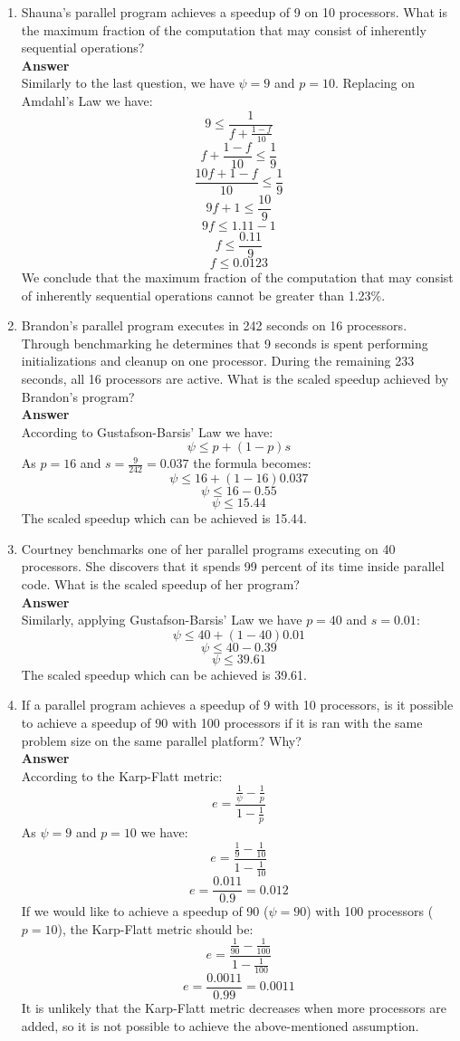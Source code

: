 \documentclass[10pt]{scrartcl}
\begin{document}
\begin{enumerate}
 \item Shauna's parallel program achieves a speedup of 9 on 10 processors. What is the maximum fraction of the computation that may consist of inherently sequential operations?
 \\ 
 \textbf{Answer}
 \\
 Similarly to the last question, we have $\psi=9$ and $p=10$.  Replacing on Amdahl's Law we have:
 $$ 9 \leq \frac{1}{f + \frac{1 - f}{10}} $$
 $$ f + \frac{1 - f}{10} \leq \frac{1}{9} $$
 $$ \frac{10f + 1 - f}{10} \leq \frac{1}{9} $$
 $$ 9f + 1 \leq \frac{10}{9} $$
 $$ 9f \leq 1.11 - 1 $$
 $$ f \leq \frac{0.11}{9} $$
 $$ f \leq 0.0123 $$
 We conclude that the maximum fraction of the computation that may consist of inherently sequential operations cannot be greater than 1.23\%.
 
 \item Brandon's parallel program executes in 242 seconds on 16 processors. Through benchmarking he determines that 9 seconds is spent performing initializations and cleanup on one processor. During the remaining 233 seconds, all 16 processors are active. What is the scaled speedup achieved by Brandon's program?
 \\ 
 \textbf{Answer}
 \\
 According to Gustafson-Barsis' Law we have:
 $$\psi \leq p + (1 - p)s$$
 As $p=16$ and $s=\frac{9}{242} = 0.037$ the formula becomes:
 $$\psi \leq 16 + (1 - 16)0.037$$
 $$\psi \leq 16 - 0.55$$
 $$\psi \leq 15.44$$
 The scaled speedup which can be achieved is 15.44. 
 
 \item Courtney benchmarks one of her parallel programs executing on 40 processors. She discovers that it spends 99 percent of its time inside parallel code. What is the scaled speedup of her program?
 \\ 
 \textbf{Answer}
 \\
 Similarly, applying Gustafson-Barsis' Law we have $p=40$ and $s=0.01$:
 $$\psi \leq 40 + (1 - 40)0.01$$
 $$\psi \leq 40 - 0.39$$
 $$\psi \leq 39.61$$
 The scaled speedup which can be achieved is 39.61. 
 
 
 \item If a parallel program achieves a speedup of 9 with 10 processors, is it possible to achieve a speedup of 90 with 100 processors if it is ran with the same problem size on the same parallel platform? Why?
 \\ 
 \textbf{Answer}
 \\
 According to the Karp-Flatt metric:
 $$e=\frac{\frac{1}{\psi}-\frac{1}{p}}{1-\frac{1}{p}}$$
 As $\psi=9$ and $p=10$ we have:
 $$e=\frac{\frac{1}{9}-\frac{1}{10}}{1-\frac{1}{10}}$$
 $$e=\frac{0.011}{0.9} = 0.012$$
 If we would like to achieve a speedup of 90 ($\psi=90$) with 100 processors ($p=10$), the Karp-Flatt metric should be:
 $$e=\frac{\frac{1}{90}-\frac{1}{100}}{1-\frac{1}{100}}$$
 $$e=\frac{0.0011}{0.99} = 0.0011$$
 It is unlikely that the Karp-Flatt metric decreases when more processors are added, so it is not possible to achieve the above-mentioned assumption.
 

\end{enumerate}
\end{document}
